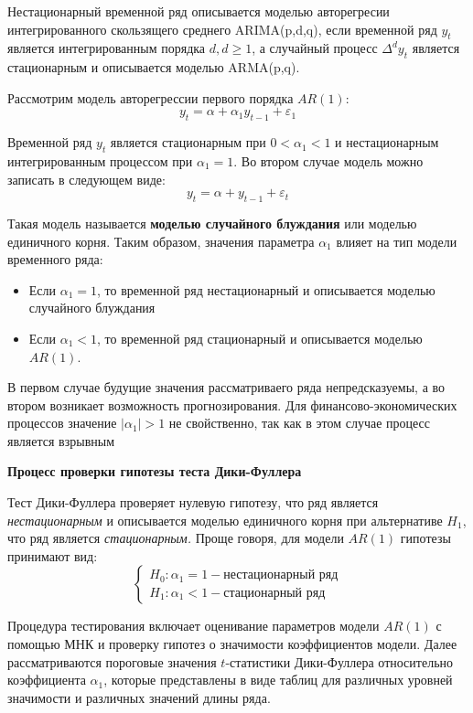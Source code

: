\documentclass[aps,%
12pt,%
final,%
oneside,
onecolumn,%
musixtex, %
superscriptaddress,%
centertags]{article} %
\theoremstyle{plain}
\theoremstyle{definition}
\theoremstyle{remark}
\begin{document}
Нестационарный временной ряд описывается моделью авторегресии интегрированного скользящего среднего ARIMA(p,d,q), если временной ряд $y_t$ является интегрированным порядка $d, d \geq 1$, а случайный процесс $\Delta^d y_t$ является стационарным и описывается моделью ARMA(p,q).

Рассмотрим модель авторегрессии первого порядка $AR(1)$:
$$y_t = \alpha + \alpha_1y_{t-1} + \varepsilon_1$$

Временной ряд $y_t$ является стационарным при $0 < \alpha_1 < 1$ и нестационарным интегрированным процессом при $\alpha_1= 1$. Во втором случае модель можно записать в следующем виде:
$$y_t = \alpha + y_{t-1} + \varepsilon_t$$

Такая модель называется \textbf{моделью случайного блуждания} или моделью единичного корня. Таким образом, значения параметра $\alpha_1$ влияет на тип модели временного ряда:

\begin{itemize}
	\item Если $\alpha_1 = 1$, то временной ряд нестационарный и описывается моделью случайного блуждания
	\item Если $\alpha_1 < 1$, то временной ряд стационарный и описывается моделью $AR(1)$.
\end{itemize}

В первом случае будущие значения рассматриваего ряда непредсказуемы, а во втором возникает возможность прогнозирования. Для финансово-экономических процессов значение $|\alpha_1| >1$ не свойственно, так как в этом случае процесс является взрывным

\textbf{Процесс проверки гипотезы теста Дики-Фуллера}

Тест Дики-Фуллера проверяет нулевую гипотезу, что ряд является \textit{нестационарным} и описывается моделью единичного корня при альтернативе $H_1$, что ряд является \textit{стационарным.} Проще говоря, для модели $AR(1)$ гипотезы принимают вид:
$$\begin{cases}
	H_0: \alpha_1 = 1  - \text{нестационарный ряд} \\
	H_1: \alpha_1 < 1 - \text{стационарный ряд}
\end{cases}$$

Процедура тестирования включает оценивание параметров модели $AR(1)$ с помощью МНК и проверку гипотез о значимости коэффициентов модели. Далее рассматриваются пороговые значения $t$-статистики Дики-Фуллера относительно коэффициента $\alpha_1$, которые представлены в виде таблиц для различных уровней значимости и различных значений длины ряда.
\end{document}
